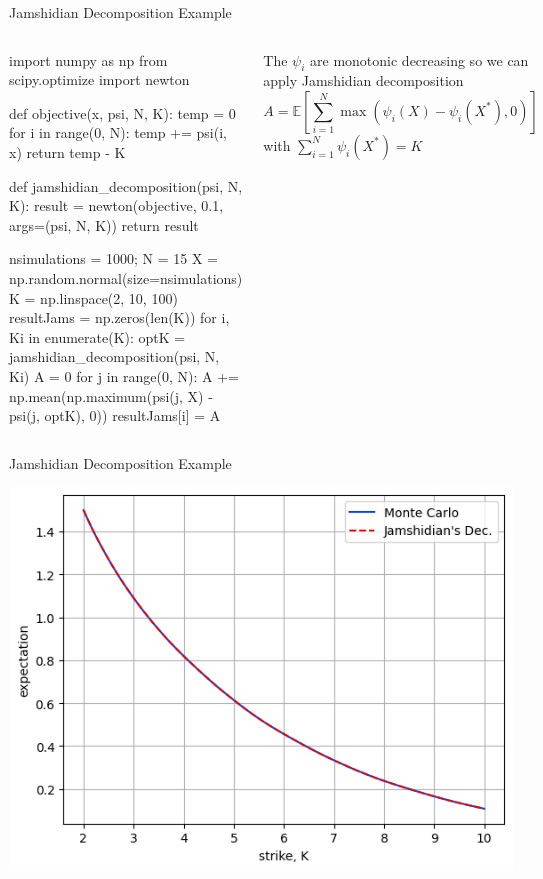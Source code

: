 \documentclass{beamer}
\begin{document}
\begin{frame}[fragile]{Jamshidian Decomposition Example}
\begin{columns}
    \begin{ipython}
import numpy as np
from scipy.optimize import newton

def objective(x, psi, N, K):
    temp = 0
    for i in range(0, N):
        temp += psi(i, x)
    return temp - K

def jamshidian_decomposition(psi, N, K):
    result = newton(objective, 0.1, args=(psi, N, K))
    return result

nsimulations = 1000; N = 15
X = np.random.normal(size=nsimulations)
K = np.linspace(2, 10, 100)
resultJams = np.zeros(len(K))
for i, Ki in enumerate(K):
  optK = jamshidian_decomposition(psi, N, Ki)
  A = 0
  for j in range(0, N):
    A += np.mean(np.maximum(psi(j, X) - psi(j, optK), 0))
  resultJams[i] = A
    \end{ipython}
The $\psi_i$ are monotonic decreasing so we can apply Jamshidian decomposition
\begin{equation*}
A = \mathbb{E}\left[\sum_{i=1}^N \max(\psi_i(X) - \psi_i(X^*), 0)\right]
\end{equation*}
with $\sum_{i=1}^N \psi_i(X^*) = K$
\end{columns}
\end{frame}

\begin{frame}{Jamshidian Decomposition Example}
\begin{center}
    \includegraphics[width=0.65\linewidth]{images/jamshidian_ex1}
\end{center}
\end{frame}
\end{document}
